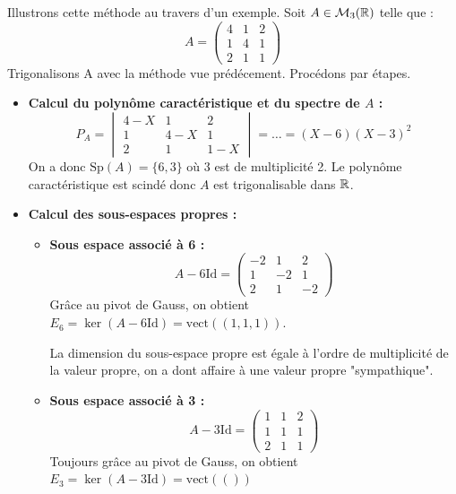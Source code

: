 \begin{example}[Trigonalisation]
    Illustrons cette méthode au travers d'un exemple. 
    Soit $A \in \mathcal{M}_3(\mathbb{R})$ telle que :
        \[ A = 
            \begin{pmatrix}
                4 & 1 & 2 \\ 
                1 & 4 & 1 \\ 
                2 & 1 & 1 
            \end{pmatrix}
        \]
    Trigonalisons A avec la méthode vue prédécement. Procédons par étapes. 

    \begin{itemize}
        \item \textbf{Calcul du polynôme caractéristique et du spectre de $A$ :}
        \[
            P_A = \begin{vmatrix}
                        4-X & 1 & 2 \\ 
                        1 & 4-X & 1 \\ 
                        2 & 1 & 1-X 
                    \end{vmatrix} 
                = \dots = (X-6)(X-3)^2
        \]
        On a donc $\text{Sp}(A) = \{6,3\}$ où 3 est de multiplicité 2. 
        Le polynôme caractéristique est scindé donc $A$ est trigonalisable dans $\mathbb{R}$. 

        \item \textbf{Calcul des sous-espaces propres :}
            \begin{itemize}
                \item \textbf{Sous espace associé à 6 :}
                \[ A - 6 \text{Id} = 
                    \begin{pmatrix}
                        -2 & 1 & 2 \\ 
                        1 & -2 & 1 \\ 
                        2 & 1 & -2 
                    \end{pmatrix}
                \]
                Grâce au pivot de Gauss, on obtient $E_6 = \ker (A - 6 \text{Id}) = \text{vect}((1,1,1))$. 

                La dimension du sous-espace propre est égale à l'ordre de multiplicité de la valeur propre, 
                on a dont affaire à une valeur propre "sympathique". 
                \item \textbf{Sous espace associé à 3 :}
                \[ A - 3 \text{Id} = 
                    \begin{pmatrix}
                        1 & 1 & 2 \\
                        1 & 1 & 1 \\ 
                        2 & 1 & 1 
                    \end{pmatrix}
                \]
                Toujours grâce au pivot de Gauss, on obtient $E_3 = \ker (A - 3 \text{Id}) = \text{vect}(())$ 
            \end{itemize}
    \end{itemize}
\end{example}